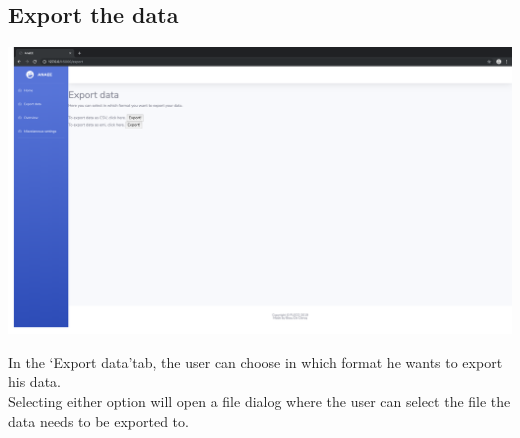 \documentclass[12pt]{article}
\begin{document}
\subsection{Export the data}
\begin{center}
	\includegraphics[width=\linewidth]{images/Export_data.png}
\end{center}
In the \lq Export data\rq tab, the user can choose in which format he wants to export his data.\\
Selecting either option will open a file dialog where the user can select the file the data needs to be exported to.
\end{document}
